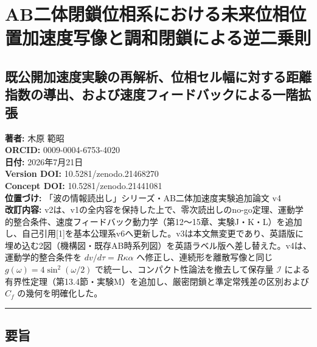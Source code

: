 \documentclass[
  a4paper,
]{ltjsarticle}
\author{}
\date{}
\begin{document}
\section{AB二体閉鎖位相系における未来位相位置加速度写像と調和閉鎖による逆二乗則}\label{abux4e8cux4f53ux9589ux9396ux4f4dux76f8ux7cfbux306bux304aux3051ux308bux672aux6765ux4f4dux76f8ux4f4dux7f6eux52a0ux901fux5ea6ux5199ux50cfux3068ux8abfux548cux9589ux9396ux306bux3088ux308bux9006ux4e8cux4e57ux5247}

\subsection{既公開加速度実験の再解析、位相セル幅に対する距離指数の導出、および速度フィードバックによる一階拡張}\label{ux65e2ux516cux958bux52a0ux901fux5ea6ux5b9fux9a13ux306eux518dux89e3ux6790ux4f4dux76f8ux30bbux30ebux5e45ux306bux5bfeux3059ux308bux8dddux96e2ux6307ux6570ux306eux5c0eux51faux304aux3088ux3073ux901fux5ea6ux30d5ux30a3ux30fcux30c9ux30d0ux30c3ux30afux306bux3088ux308bux4e00ux968eux62e1ux5f35}

\textbf{著者:} 木原 範昭\\
\textbf{ORCID:} 0009-0004-6753-4020\\
\textbf{日付:} 2026年7月21日\\
\textbf{Version DOI:} 10.5281/zenodo.21468270\\
\textbf{Concept DOI:} 10.5281/zenodo.21441081\\
\textbf{位置づけ:} 「波の情報読出し」シリーズ・AB二体加速度実験追加論文
v4\\
\textbf{改訂内容:}
v2は、v1の全内容を保持した上で、零次読出しのno-go定理、運動学的整合条件、速度フィードバック動力学（第12〜15章、実験J・K・L）を追加し、自己引用{[}1{]}を基本公理系v6へ更新した。v3は本文無変更であり、英語版に埋め込む2図（機構図・既存AB時系列図）を英語ラベル版へ差し替えた。v4は、運動学的整合条件を
\(dv/d\tau=R\kappa\alpha\) へ修正し、連続形を離散写像と同じ
\(g(\omega)=4\sin^2(\omega/2)\)
で統一し、コンパクト性論法を撤去して保存量 \(\mathcal I\)
による有界性定理（第13.4節・実験M）を追加し、厳密閉鎖と準定常残差の区別および
\(C_f\) の幾何を明確化した。

\begin{center}\rule{0.5\linewidth}{0.5pt}\end{center}

\subsection{要旨}\label{ux8981ux65e8}
\end{document}
